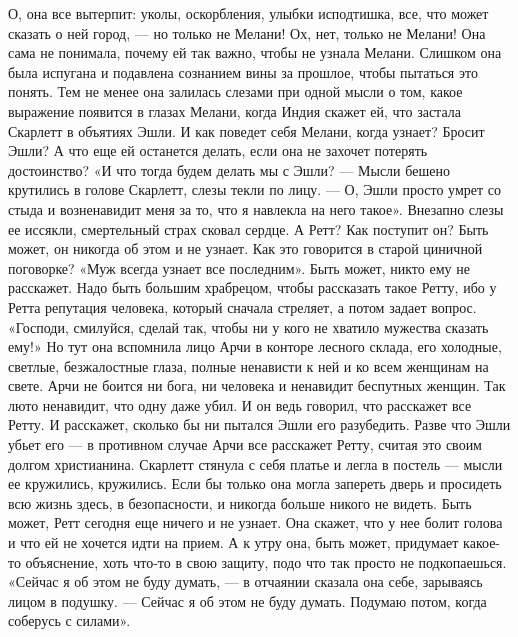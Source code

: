 О, она все вытерпит: уколы, оскорбления, улыбки исподтишка, все, что может сказать о ней город, — но только не Мелани! Ох, нет, только не Мелани! Она сама не понимала, почему ей так важно, чтобы не узнала Мелани. Слишком она была испугана и подавлена сознанием вины за прошлое, чтобы пытаться это понять. Тем не менее она залилась слезами при одной мысли о том, какое выражение появится в глазах Мелани, когда Индия скажет ей, что застала Скарлетт в объятиях Эшли. И как поведет себя Мелани, когда узнает? Бросит Эшли? А что еще ей останется делать, если она не захочет потерять достоинство? «И что тогда будем делать мы с Эшли? — Мысли бешено крутились в голове Скарлетт, слезы текли по лицу. — О, Эшли просто умрет со стыда и возненавидит меня за то, что я навлекла на него такое». Внезапно слезы ее иссякли, смертельный страх сковал сердце. А Ретт? Как поступит он?
Быть может, он никогда об этом и не узнает. Как это говорится в старой циничной поговорке? «Муж всегда узнает все последним». Быть может, никто ему не расскажет. Надо быть большим храбрецом, чтобы рассказать такое Ретту, ибо у Ретта репутация человека, который сначала стреляет, а потом задает вопрос. «Господи, смилуйся, сделай так, чтобы ни у кого не хватило мужества сказать ему!» Но тут она вспомнила лицо Арчи в конторе лесного склада, его холодные, светлые, безжалостные глаза, полные ненависти к ней и ко всем женщинам на свете. Арчи не боится ни бога, ни человека и ненавидит беспутных женщин. Так люто ненавидит, что одну даже убил. И он ведь говорил, что расскажет все Ретту. И расскажет, сколько бы ни пытался Эшли его разубедить. Разве что Эшли убьет его — в противном случае Арчи все расскажет Ретту, считая это своим долгом христианина.
Скарлетт стянула с себя платье и легла в постель — мысли ее кружились, кружились. Если бы только она могла запереть дверь и просидеть всю жизнь здесь, в безопасности, и никогда больше никого не видеть. Быть может, Ретт сегодня еще ничего и не узнает. Она скажет, что у нее болит голова и что ей не хочется идти на прием. А к утру она, быть может, придумает какое-то объяснение, хоть что-то в свою защиту, подо что так просто не подкопаешься.
«Сейчас я об этом не буду думать, — в отчаянии сказала она себе, зарываясь лицом в подушку. — Сейчас я об этом не буду думать. Подумаю потом, когда соберусь с силами».
